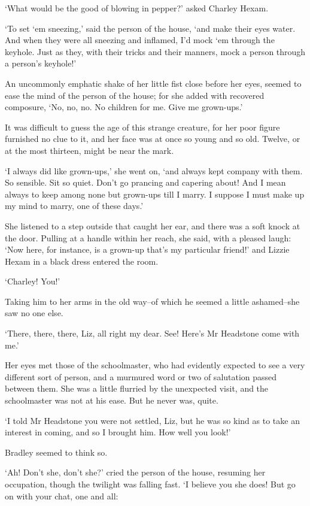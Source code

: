 ‘What would be the good of blowing in pepper?’ asked Charley Hexam.

‘To set ‘em sneezing,’ said the person of the house, ‘and make their
eyes water. And when they were all sneezing and inflamed, I’d mock ‘em
through the keyhole. Just as they, with their tricks and their manners,
mock a person through a person’s keyhole!’

An uncommonly emphatic shake of her little fist close before her eyes,
seemed to ease the mind of the person of the house; for she added
with recovered composure, ‘No, no, no. No children for me. Give me
grown-ups.’

It was difficult to guess the age of this strange creature, for her poor
figure furnished no clue to it, and her face was at once so young and so
old. Twelve, or at the most thirteen, might be near the mark.

‘I always did like grown-ups,’ she went on, ‘and always kept company
with them. So sensible. Sit so quiet. Don’t go prancing and capering
about! And I mean always to keep among none but grown-ups till I marry.
I suppose I must make up my mind to marry, one of these days.’

She listened to a step outside that caught her ear, and there was a soft
knock at the door. Pulling at a handle within her reach, she said,
with a pleased laugh: ‘Now here, for instance, is a grown-up that’s my
particular friend!’ and Lizzie Hexam in a black dress entered the room.

‘Charley! You!’

Taking him to her arms in the old way--of which he seemed a little
ashamed--she saw no one else.

‘There, there, there, Liz, all right my dear. See! Here’s Mr Headstone
come with me.’

Her eyes met those of the schoolmaster, who had evidently expected
to see a very different sort of person, and a murmured word or two
of salutation passed between them. She was a little flurried by the
unexpected visit, and the schoolmaster was not at his ease. But he never
was, quite.

‘I told Mr Headstone you were not settled, Liz, but he was so kind as to
take an interest in coming, and so I brought him. How well you look!’

Bradley seemed to think so.

‘Ah! Don’t she, don’t she?’ cried the person of the house, resuming her
occupation, though the twilight was falling fast. ‘I believe you she
does! But go on with your chat, one and all:

